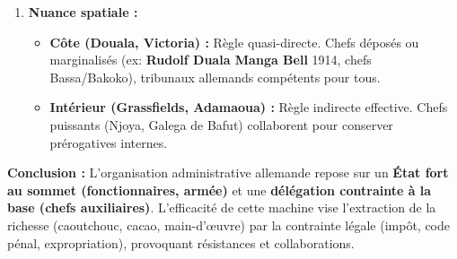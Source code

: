 \documentclass[11pt]{article}
\begin{document}
\begin{exoresolu}
\begin{enumerate}
\begin{itemize}
        \item \textbf{L'expropriation foncière :} Décrets de 1896, 1899, 1901, 1913 (Douala). Déclaration des « terres vacantes et sans maître » (Konklusen) $\rightarrow$ attribution aux compagnies (Woermann, Jantzen \& Thormählen, Plantations sociétés) $\rightarrow$ déplacements de populations (ex: Bassa, Bakoko, Duala).
    \end{itemize}
    \item \textbf{Nuance spatiale :}
    \begin{itemize}
        \item \textbf{Côte (Douala, Victoria) :} Règle quasi-directe. Chefs déposés ou marginalisés (ex: \textbf{Rudolf Duala Manga Bell} 1914, chefs Bassa/Bakoko), tribunaux allemands compétents pour tous.
        \item \textbf{Intérieur (Grassfields, Adamaoua) :} Règle indirecte effective. Chefs puissants (Njoya, Galega de Bafut) collaborent pour conserver prérogatives internes.
    \end{itemize}
\end{enumerate}
\textbf{Conclusion :} L'organisation administrative allemande repose sur un \textbf{État fort au sommet (fonctionnaires, armée)} et une \textbf{délégation contrainte à la base (chefs auxiliaires)}. L'efficacité de cette machine vise l'extraction de la richesse (caoutchouc, cacao, main-d'œuvre) par la contrainte légale (impôt, code pénal, expropriation), provoquant résistances et collaborations.
\end{exoresolu}
\end{document}
